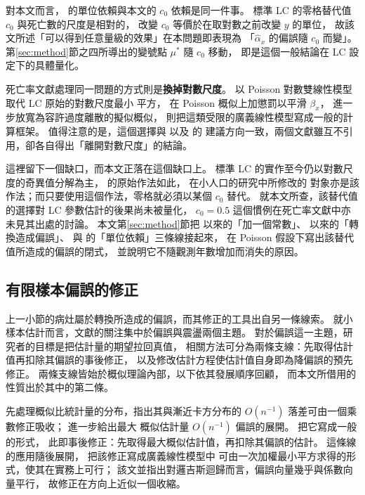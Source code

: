 \documentclass[UTF8, fontset=macnew, a4paper, 12pt]{ctexart}
\begin{document}
對本文而言，\citet{chenroth2024} 的單位依賴與本文的 $c_0$ 依賴是同一件事。
標準 LC 的零格替代值 $c_0$ 與死亡數的尺度是相對的，
改變 $c_0$ 等價於在取對數之前改變 $y$ 的單位，
故該文所述「可以得到任意量級的效果」在本問題即表現為
「$\hat\alpha_x$ 的偏誤隨 $c_0$ 而變」。
第\ref{sec:method}節之四所導出的變號點 $\mu^\ast$ 隨 $c_0$ 移動，
即是這個一般結論在 LC 設定下的具體量化。

死亡率文獻處理同一問題的方式則是\textbf{換掉對數尺度}。
\citet{brouhns2002} 以 Poisson 對數雙線性模型取代 LC 原始的對數尺度最小
平方，\citet{delwarde2007} 在 Poisson 概似上加懲罰以平滑 $\beta_x$，
\citet{djeundje2010} 進一步放寬為容許過度離散的擬似概似，
\citet{currie2013} 則把這類受限的廣義線性模型寫成一般的計算框架。
值得注意的是，這個選擇與 \citet{chenroth2024} 以及 \citet{mullahy2024} 的
建議方向一致，兩個文獻雖互不引用，卻各自得出「離開對數尺度」的結論。

這裡留下一個缺口，而本文正落在這個缺口上。
標準 LC 的實作至今仍以對數尺度的奇異值分解為主，
\citet{lee1992} 的原始作法如此，\citet{yue2019} 在小人口的研究中所修改的
對象亦是該作法；而只要使用這個作法，零格就必須以某個 $c_0$ 替代。
就本文所查，該替代值的選擇對 LC 參數估計的後果尚未被量化，
$c_0=0.5$ 這個慣例在死亡率文獻中亦未見其出處的討論。
本文第\ref{sec:method}節把 \citet{haldane1956} 以來的「加一個常數」、
\citet{duan1983} 以來的「轉換造成偏誤」、
與 \citet{chenroth2024} 的「單位依賴」三條線接起來，
在 Poisson 假設下寫出該替代值所造成的偏誤的閉式，
並說明它不隨觀測年數增加而消失的原因。
\subsection{有限樣本偏誤的修正}\label{sec:biasred}

上一小節的病灶屬於轉換所造成的偏誤，而其修正的工具出自另一條線索。
就小樣本估計而言，文獻的關注集中於偏誤與震盪兩個主題。
對於偏誤這一主題，研究者的目標是把估計量的期望拉回真值，
相關方法可分為兩條支線：先取得估計值再扣除其偏誤的事後修正，
以及修改估計方程使估計值自身即為降偏誤的預先修正。
兩條支線皆始於概似理論內部，以下依其發展順序回顧，
而本文所借用的性質出於其中的第二條。

\citet{bartlett1937} 先處理概似比統計量的分布，指出其與漸近卡方分布的
$O(n^{-1})$ 落差可由一個乘數修正吸收；\citet{bartlett1953} 進一步給出最大
概似估計量 $O(n^{-1})$ 偏誤的展開。\citet{coxsnell1968} 把它寫成一般的形式，
此即事後修正：先取得最大概似估計值，再扣除其偏誤的估計。
這條線的應用隨後展開，\citet{cordeiro1991} 把該修正寫成廣義線性模型中
可由一次加權最小平方求得的形式，使其在實務上可行；
該文並指出對邏吉斯迴歸而言，偏誤向量幾乎與係數向量平行，
故修正在方向上近似一個收縮。
\end{document}
